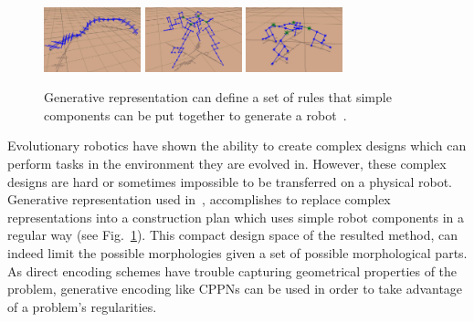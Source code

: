\begin{figure}[h!]
\centering
\includegraphics[width=0.25\textwidth,height=0.2\textwidth]{../Figures/Misc/rules1.png}
\includegraphics[width=0.25\textwidth,height=0.2\textwidth]{../Figures/Misc/rules2.png}
\includegraphics[width=0.25\textwidth,height=0.2\textwidth]{../Figures/Misc/rules3.png}
\caption{Generative representation can define a set of rules that simple components can be put together to generate a robot~\citep{hornby2003generative}.}
\label{fig:rules}
\end{figure}

Evolutionary robotics have shown the ability to create complex designs which can perform tasks in the environment they are evolved in. However, these complex designs are hard or sometimes impossible to be transferred on a physical robot. Generative representation used in~\citep{hornby2003generative}, accomplishes to replace complex representations into a construction plan which uses simple robot components in a regular way (see Fig.~\ref{fig:rules}). This compact design space of the resulted method, can indeed limit the possible morphologies given a set of possible morphological parts. As direct encoding schemes have trouble capturing geometrical properties of the problem, generative encoding like CPPNs can be used in order to take advantage of a problem's regularities.

